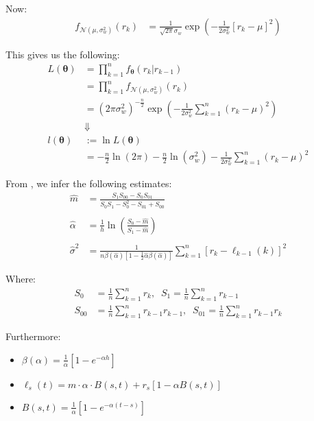 Now: 
\begin{align*}
f_{\mathcal{N}(\mu, \sigma_{w}^{2})}(r_{k}) &=
\frac{1}{\sqrt{2\pi}\sigma_{w}}\exp\left(
-\frac{1}{2\sigma_{w}^{2}}\left[r_{k} - \mu \right]^{2}
\right)
\end{align*}

This gives us the following: 
\begin{align*}
L(\bm{\theta}) &= \prod_{k=1}^{n}f_{\bm{\theta}}(r_{k}|r_{k-1}) \\ 
&= 
\prod_{k=1}^{n}f_{\mathcal{N}(\mu, \sigma_{w}^{2})}(r_{k}) 
\\ 
&= 
(2\pi\sigma_{w}^{2})^{-\frac{n}{2}}\exp\left(
-\frac{1}{2\sigma_{w}^{2}}\sum_{k=1}^{n}\left(
r_{k} - \mu
\right)^{2}
\right) \\ 
&\Downarrow \\ 
l(\bm{\theta}) &:= \ln L(\bm{\theta}) \\
&= 
-\frac{n}{2}\ln(2\pi) - \frac{n}{2}\ln(\sigma_{w}^{2})
-\frac{1}{2\sigma_{w}^{2}}\sum_{k=1}^{n}\left(r_{k} - \mu \right)^{2}
\end{align*}

\newpage
From \cite{fergusson2015application}, we infer the following estimates: 
\begin{align*}
\hat{m} &= \frac{
S_{1}S_{00}-S_{0}S_{01}
}{
S_{0}S_{1}-S_{0}^{2}-S_{01} + S_{00}
}\\
\\ 
\hat{\alpha} &= \frac{1}{h}\ln\left(
\frac{S_{0}-\hat{m}}{S_{1}-\hat{m}}
\right) \\ 
\\ 
\hat{\sigma}^{2} &= 
\frac{
1}{
n\beta(\hat{\alpha})[1-\frac{1}{2}\hat{\alpha}\beta(\hat{\alpha})]
}
\sum_{k=1}^{n}[
r_{k}-\ell_{k-1}(k)
]^{2}
\end{align*}

Where:
\begin{align*}
S_{0} &= \frac{1}{n}\sum_{k=1}^{n}r_{k}, \;\; 
S_{1} = \frac{1}{n}\sum_{k=1}^{n}r_{k-1} \\ 
S_{00} &= \frac{1}{n}\sum_{k=1}^{n}r_{k-1}r_{k-1}, \;\; 
S_{01} = \frac{1}{n}\sum_{k=1}^{n}r_{k-1}r_{k}
\end{align*}

Furthermore: 
\begin{itemize}[leftmargin =*]
    \item $\beta(\alpha) =\frac{1}{\alpha}\left[
    1 - e^{-\alpha h}
    \right]$ 
    \item $\ell_{s}(t) = m\cdot\alpha\cdot B(s,t) + r_{s}[1-\alpha B(s,t)] $ 
    \item $B(s,t) = \frac{1}{\alpha}\left[
    1-e^{-\alpha(t-s)}\right]$
\end{itemize}


